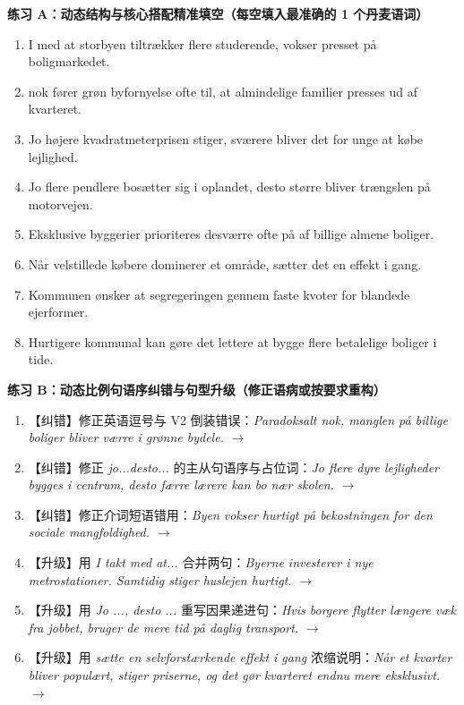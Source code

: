 \textbf{练习 A：动态结构与核心搭配精准填空（每空填入最准确的 1 个丹麦语词）}
\begin{enumerate}
  \item I \underline{\hspace{2.2cm}} med at storbyen tiltrækker flere studerende, vokser presset på boligmarkedet.
  \item \underline{\hspace{2.2cm}} nok fører grøn byfornyelse ofte til, at almindelige familier presses ud af kvarteret.
  \item Jo højere kvadratmeterprisen stiger, \underline{\hspace{2.2cm}} sværere bliver det for unge at købe lejlighed.
  \item Jo flere pendlere \underline{\hspace{2.2cm}} bosætter sig i oplandet, desto større bliver trængslen på motorvejen.
  \item Eksklusive byggerier prioriteres desværre ofte på \underline{\hspace{2.2cm}} af billige almene boliger.
  \item Når velstillede købere dominerer et område, sætter det en \underline{\hspace{2.2cm}} effekt i gang.
  \item Kommunen ønsker at \underline{\hspace{2.2cm}} segregeringen gennem faste kvoter for blandede ejerformer.
  \item Hurtigere kommunal \underline{\hspace{2.2cm}} kan gøre det lettere at bygge flere betalelige boliger i tide.
\end{enumerate}

\textbf{练习 B：动态比例句语序纠错与句型升级（修正语病或按要求重构）}
\begin{enumerate}
  \item 【纠错】修正英语逗号与 V2 倒装错误：\textit{Paradoksalt nok, manglen på billige boliger bliver værre i grønne bydele.} $\rightarrow$
  \item 【纠错】修正 \textit{jo...desto...} 的主从句语序与占位词：\textit{Jo flere dyre lejligheder bygges i centrum, desto færre lærere kan bo nær skolen.} $\rightarrow$
  \item 【纠错】修正介词短语错用：\textit{Byen vokser hurtigt på bekostningen for den sociale mangfoldighed.} $\rightarrow$
  \item 【升级】用 \textit{I takt med at...} 合并两句：\textit{Byerne investerer i nye metrostationer. Samtidig stiger huslejen hurtigt.} $\rightarrow$
  \item 【升级】用 \textit{Jo ..., desto ...} 重写因果递进句：\textit{Hvis borgere flytter længere væk fra jobbet, bruger de mere tid på daglig transport.} $\rightarrow$
  \item 【升级】用 \textit{sætte en selvforstærkende effekt i gang} 浓缩说明：\textit{Når et kvarter bliver populært, stiger priserne, og det gør kvarteret endnu mere eksklusivt.} $\rightarrow$
\end{enumerate}

